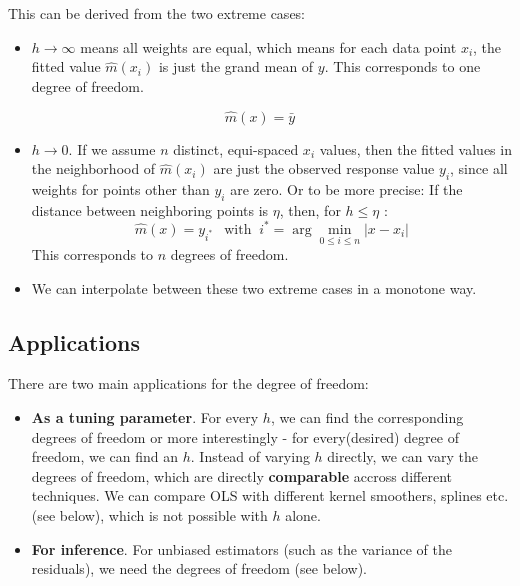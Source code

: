 \documentclass[]{book}
\providecommand{\tightlist}{%
  \setlength{\itemsep}{0pt}\setlength{\parskip}{0pt}}
\begin{document}
This can be derived from the two extreme cases:

\begin{itemize}
\tightlist
\item
  \(h \rightarrow \infty\) means all weights are equal, which means for
  each data point \(x_i\), the fitted value \(\hat{m}(x_i)\) is just the
  grand mean of \(y\). This corresponds to one degree of freedom.
\end{itemize}

\[\hat{m}(x) = \bar{y} \]

\begin{itemize}
\tightlist
\item
  \(h \rightarrow 0\). If we assume \(n\) distinct, equi-spaced \(x_i\)
  values, then the fitted values in the neighborhood of \(\hat{m}(x_i)\)
  are just the observed response value \(y_i\), since all weights for
  points other than \(y_i\) are zero. Or to be more precise: If the
  distance between neighboring points is \(\eta\), then, for
  \(h \leqslant \eta\) :
  \[ \hat{m}(x) = y_{i^*} \;\;\ \text{with} \;\; i^* =  
    \arg\min\limits_{0 \leqslant i \leqslant n} |x - x_i| \] This
  corresponds to \(n\) degrees of freedom.
\item
  We can interpolate between these two extreme cases in a monotone way.
\end{itemize}

\subsection{Applications}\label{applications}

There are two main applications for the degree of freedom:

\begin{itemize}
\tightlist
\item
  \textbf{As a tuning parameter}. For every \(h\), we can find the
  corresponding degrees of freedom or more interestingly - for
  every(desired) degree of freedom, we can find an \(h\). Instead of
  varying \(h\) directly, we can vary the degrees of freedom, which are
  directly \textbf{comparable} accross different techniques. We can
  compare OLS with different kernel smoothers, splines etc. (see below),
  which is not possible with \(h\) alone.
\item
  \textbf{For inference}. For unbiased estimators (such as the variance
  of the residuals), we need the degrees of freedom (see below).
\end{itemize}
\end{document}
